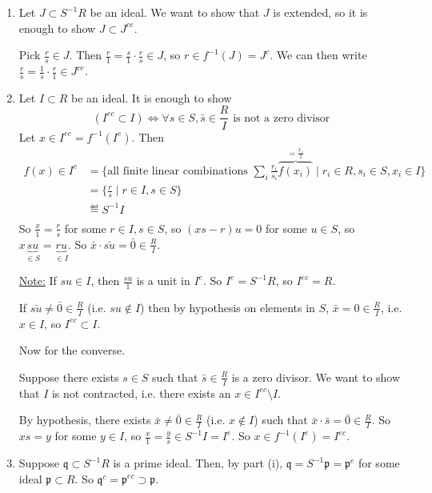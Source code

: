 \documentclass[x11names,reqno,14pt]{extarticle}
\newcommand{\mk}[1]{\mathfrak{#1}}
\begin{document}
\begin{enumerate}[label=(\roman*)]

\item Let $J \subset S^{-1}R$ be an ideal. We want to show that $J$ is extended, so it is enough to show $J \subset J^{ce}$.

Pick $\frac{r}{s} \in J$. Then $\frac{r}{1} = \frac{s}{1}\cdot\frac{r}{s}\in J$, so $r \in f^{-1}(J) = J^c$. We can then write $\frac{r}{s} = \frac{1}{s}\cdot\frac{r}{1} \in J^{ce}$.

\item Let $I \subset R$ be an ideal. It is enough to show 
\[
(I^{ec} \subset I) \iff \forall s \in S, \bar{s}\in\frac{R}{I}\text{ is not a zero divisor}
\]
Let $x \in I^{ec} = f^{-1}(I^e)$. Then 
\begin{align*}
f(x) \in I^e & = \{\text{all finite linear combinations }\sum_i\frac{r_i}{s_i}\overbrace{f(x_i)}^{=\frac{x_i}{1}} \mid r_i \in R, s_i \in S, x_i \in I \} \\
				 & = \{\frac{r}{s} \mid r \in I, s \in S \} \\
				 & \eqdef S^{-1}I \\
\end{align*}
So $\frac{x}{1} = \frac{r}{s}$ for some $r \in I, s \in S$, so $(xs - r)u = 0$ for some $u \in S$, so $x\underbrace{su}_{\in S} = \underbrace{ru}_{\in I}$. So $\bar{x}\cdot\bar{su} = \bar{0}\in \frac{R}{I}$.

\underline{Note:} If $su \in I$, then $\frac{su}{1}$ is a unit in $I^e$. So $I^e = S^{-1}R$, so $I^{ec} = R$.  

If $\bar{su}\neq\bar{0} \in \frac{R}{I}$ (i.e. $su \not\in I$) then by hypothesis on elements in $S$, $\bar{x} = 0 \in \frac{R}{I}$, i.e. $x \in I$, so $I^{ec} \subset I$. 

Now for the converse.

Suppose there exists $s \in S$ such that $\bar{s}\in\frac{R}{I}$ is a zero divisor. We want to show that $I$ is not contracted, i.e. there exists an $x \in I^{ec}\setminus I$. 

By hypothesis, there exists $\bar{x}\neq\bar{0}\in \frac{R}{I}$ (i.e. $x\not\in I$) such that $\bar{x}\cdot\bar{s} = \bar{0}\in\frac{R}{I}$. So $xs = y$ for some $y \in I$, so $\frac{x}{1} = \frac{y}{s}\in S^{-1}I = I^e$. So $x \in f^{-1}(I^e) = I^{ec}$.   

\item Suppose $\mk{q} \subset S^{-1}R$ is a prime ideal. Then, by part (i), $\mk{q} = S^{-1}\mk{p} = \mk{p}^e$ for some ideal $\mk{p}\subset R$. So $\mk{q}^c = \mk{p}^{ec} \supset \mk{p}$. 


\end{enumerate}
\end{document}
